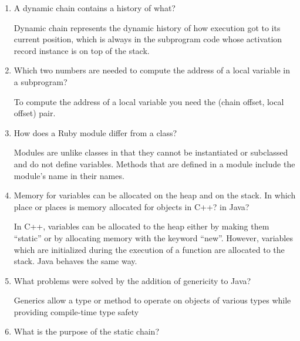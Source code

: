 \begin{enumerate}
\begin{answer}
  \end{answer}

  \item A dynamic chain contains a history of what?

  \begin{answer}
  Dynamic chain represents the dynamic history of how execution got to its current position, which is always in the subprogram code whose activation record instance is on top of the stack.
  \end{answer}

  \item Which two numbers are needed to compute
    the address of a local variable in a subprogram?

  \begin{answer}
  To compute the address of a local variable you need the (chain offset, local offset) pair.
  \end{answer}
  
  \item How does a Ruby module differ from a class?

  \begin{answer}
   Modules are unlike classes in that they cannot be instantiated or subclassed and do not define variables. Methods that are defined in a module include the  module’s name in their names.

  \end{answer}
  \item Memory for variables can be allocated on the heap
    and on the stack. In which place or places is memory
    allocated for objects in C++? in Java?

  \begin{answer}
  In C++, variables can be allocated to the heap either by making them “static” or by allocating memory with the keyword “new”. However, variables which are initialized during the execution of a function are allocated to the stack. Java behaves the same way.
  \end{answer}

  \item What problems were solved by the addition
    of genericity to Java?

  \begin{answer}
  Generics allow a type or method to operate on objects of various types while providing compile-time type safety
  \end{answer} 

  \item What is the purpose of the static chain?


\end{enumerate}
